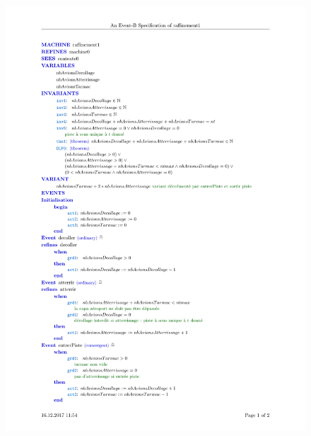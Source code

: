  
 \begin{figure}[H]
 	\begin{center}	
 		\includegraphics[scale=0.8]{images/1/machine1}
 		\caption{}
 		\label{machine1}
 	\end{center}
 \end{figure}
 




